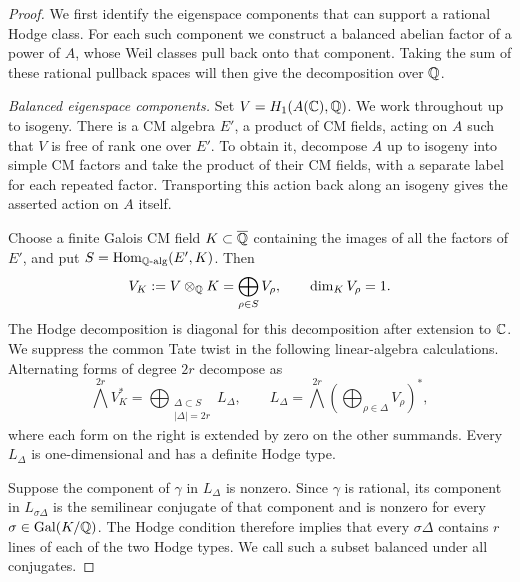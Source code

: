 \begin{proof}
We first identify the eigenspace components that can support a rational
Hodge class.  For each such component we construct a balanced abelian
factor of a power of $A$, whose Weil classes pull back onto that
component.  Taking the sum of these rational pullback spaces will then
give the decomposition over $\mathbb Q$.

\medskip\noindent
\emph{Balanced eigenspace components.}
Set $V=H_1(A(\mathbb C),\mathbb Q)$.  We work throughout up to isogeny.  There is a
CM algebra $E'$, a product of CM fields, acting on $A$ such that $V$ is
free of rank one over $E'$.  To obtain it, decompose $A$ up to isogeny
into simple CM factors and take the product of their CM fields, with a
separate label for each repeated factor.  Transporting this action back
along an isogeny gives the asserted action on $A$ itself.

Choose a finite Galois CM field $K\subset\overline{\mathbb Q}$ containing the images of
all the factors of $E'$, and put $S=\operatorname{Hom}_{\mathbb Q\text{-alg}}(E',K)$.  Then
\[
                V_K:=V\otimes_{\mathbb Q}K=\bigoplus_{\rho\in S}V_\rho,
                \qquad \dim_K V_\rho=1.
\]
The Hodge decomposition is diagonal for this decomposition after
extension to $\mathbb C$.  We suppress the common Tate twist in the following
linear-algebra calculations.  Alternating forms of degree $2r$ decompose
as
\[
 \bigwedge^{2r}V_K^*
     =\bigoplus_{\substack{\Delta\subset S\\ |\Delta|=2r}}L_\Delta,
 \qquad
 L_\Delta=
 \bigwedge^{2r}\left(\bigoplus_{\rho\in\Delta}V_\rho\right)^*,
\]
where each form on the right is extended by zero on the other summands.
Every $L_\Delta$ is one-dimensional and has a definite Hodge type.

Suppose the component of $\gamma$ in $L_\Delta$ is nonzero.  Since
$\gamma$ is rational, its component in $L_{\sigma\Delta}$ is the
semilinear conjugate of that component and is nonzero for every
$\sigma\in\operatorname{Gal}(K/\mathbb Q)$.  The Hodge condition therefore implies that
every $\sigma\Delta$ contains $r$ lines of each of the two Hodge types.
We call such a subset balanced under all conjugates.


\end{proof}
